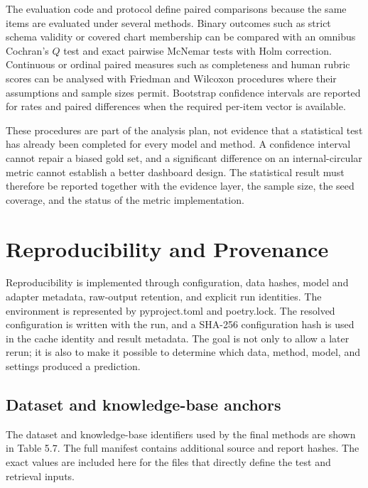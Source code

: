 The evaluation code and protocol define paired comparisons because the same items are evaluated under several methods. Binary outcomes such as strict schema validity or covered chart membership can be compared with an omnibus Cochran's \(Q\) test and exact pairwise McNemar tests with Holm correction. Continuous or ordinal paired measures such as completeness and human rubric scores can be analysed with Friedman and Wilcoxon procedures where their assumptions and sample sizes permit. Bootstrap confidence intervals are reported for rates and paired differences when the required per-item vector is available.

These procedures are part of the analysis plan, not evidence that a statistical test has already been completed for every model and method. A confidence interval cannot repair a biased gold set, and a significant difference on an internal-circular metric cannot establish a better dashboard design. The statistical result must therefore be reported together with the evidence layer, the sample size, the seed coverage, and the status of the metric implementation.

\section{Reproducibility and Provenance}

Reproducibility is implemented through configuration, data hashes, model and adapter metadata, raw-output retention, and explicit run identities. The environment is represented by pyproject.toml and poetry.lock. The resolved configuration is written with the run, and a SHA-256 configuration hash is used in the cache identity and result metadata. The goal is not only to allow a later rerun; it is also to make it possible to determine which data, method, model, and settings produced a prediction.

\subsection{Dataset and knowledge-base anchors}

The dataset and knowledge-base identifiers used by the final methods are shown in Table 5.7. The full manifest contains additional source and report hashes. The exact values are included here for the files that directly define the test and retrieval inputs.

